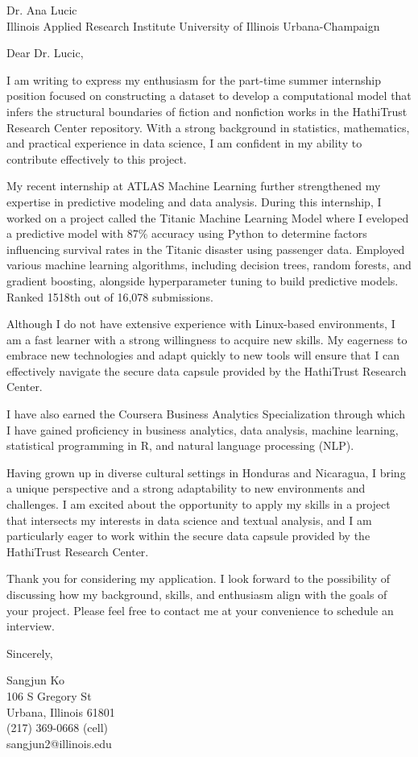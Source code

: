 \documentclass{letter}
\begin{document}
\begin{letter}{Dr. Ana Lucic\\
    Illinois Applied Research Institute
    University of Illinois Urbana-Champaign}


\opening{Dear Dr. Lucic,}
I am writing to express my enthusiasm for the part-time summer internship position focused on constructing a dataset to develop a computational model that infers the structural boundaries of fiction and nonfiction works in the HathiTrust Research Center repository. With a strong background in statistics, mathematics, and practical experience in data science, I am confident in my ability to contribute effectively to this project.

My recent internship at ATLAS Machine Learning further strengthened my expertise in predictive modeling and data analysis. During this internship, I worked on a project called the Titanic Machine Learning Model where I eveloped a predictive model with 87\% accuracy using Python to determine factors influencing survival rates in the Titanic disaster using passenger data. Employed various machine learning algorithms, including decision trees, random forests, and gradient boosting, alongside hyperparameter tuning to build predictive models. Ranked 1518th out of 16,078 submissions.

Although I do not have extensive experience with Linux-based environments, I am a fast learner with a strong willingness to acquire new skills. My eagerness to embrace new technologies and adapt quickly to new tools will ensure that I can effectively navigate the secure data capsule provided by the HathiTrust Research Center.

I have also earned the Coursera Business Analytics Specialization through which I have gained proficiency in business analytics, data analysis, machine learning, statistical programming in R, and natural language processing (NLP).

Having grown up in diverse cultural settings in Honduras and Nicaragua, I bring a unique perspective and a strong adaptability to new environments and challenges. I am excited about the opportunity to apply my skills in a project that intersects my interests in data science and textual analysis, and I am particularly eager to work within the secure data capsule provided by the HathiTrust Research Center.

Thank you for considering my application. I look forward to the possibility of discussing how my background, skills, and enthusiasm align with the goals of your project. Please feel free to contact me at your convenience to schedule an interview.

\closing{Sincerely,
}

Sangjun Ko\\
106 S Gregory St\\
Urbana, Illinois 61801\\
(217) 369-0668 (cell)\\sangjun2@illinois.edu
\end{letter}
\end{document}
